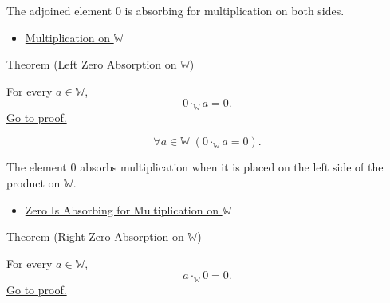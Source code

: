 \begin{remark*}[Interpretation]
The adjoined element $0$ is absorbing for multiplication on both sides.
\end{remark*}

\begin{dependencies}
\begin{itemize}
  \item \hyperref[def:multiplication-on-w]{Multiplication on $\mathbb{W}$}
\end{itemize}
\end{dependencies}

\begin{theorembox}{Theorem (Left Zero Absorption on \texorpdfstring{$\mathbb{W}$}{W})}
\begin{theorem}
\label{thm:left-zero-absorption-on-w}
For every $a\in\mathbb{W}$,
\[
0\cdot_{\mathbb{W}}a=0.
\]
\hyperref[prf:left-zero-absorption-on-w]{Go to proof.}
\end{theorem}
\end{theorembox}

\begin{remark*}
\[
\forall a\in\mathbb{W}\;(0\cdot_{\mathbb{W}}a=0).
\]
\end{remark*}

\begin{remark*}[Interpretation]
The element $0$ absorbs multiplication when it is placed on the left side of
the product on $\mathbb{W}$.
\end{remark*}

\begin{dependencies}
\begin{itemize}
  \item \hyperref[thm:zero-absorbing-for-multiplication-on-w]{Zero Is Absorbing for Multiplication on $\mathbb{W}$}
\end{itemize}
\end{dependencies}

\begin{theorembox}{Theorem (Right Zero Absorption on \texorpdfstring{$\mathbb{W}$}{W})}
\begin{theorem}
\label{thm:right-zero-absorption-on-w}
For every $a\in\mathbb{W}$,
\[
a\cdot_{\mathbb{W}}0=0.
\]
\hyperref[prf:right-zero-absorption-on-w]{Go to proof.}
\end{theorem}
\end{theorembox}

